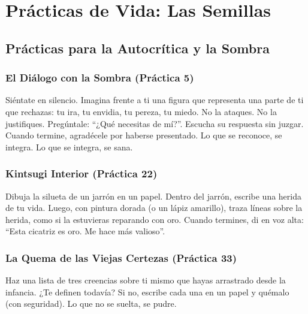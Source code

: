 \documentclass[12pt,openany]{book}
\begin{document}
\part{Prácticas de Vida: Las Semillas}

\chapter{Prácticas para la Autocrítica y la Sombra}

\section{El Diálogo con la Sombra (Práctica 5)}
\begin{practica}
Siéntate en silencio. Imagina frente a ti una figura que representa una
parte de ti que rechazas: tu ira, tu envidia, tu pereza, tu miedo. No
la ataques. No la justifiques. Pregúntale: ``¿Qué necesitas de mí?''.
Escucha su respuesta sin juzgar. Cuando termine, agradécele por haberse
presentado. Lo que se reconoce, se integra. Lo que se integra, se sana.
\end{practica}

\section{Kintsugi Interior (Práctica 22)}
\begin{practica}
Dibuja la silueta de un jarrón en un papel. Dentro del jarrón, escribe
una herida de tu vida. Luego, con pintura dorada (o un lápiz amarillo),
traza líneas sobre la herida, como si la estuvieras reparando con oro.
Cuando termines, di en voz alta: ``Esta cicatriz es oro. Me hace más
valioso''.
\end{practica}

\section{La Quema de las Viejas Certezas (Práctica 33)}
\begin{practica}
Haz una lista de tres creencias sobre ti mismo que hayas arrastrado
desde la infancia. ¿Te definen todavía? Si no, escribe cada una en un
papel y quémalo (con seguridad). Lo que no se suelta, se pudre.
\end{practica}
\end{document}
